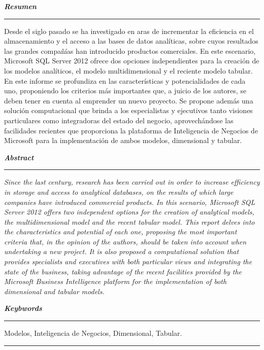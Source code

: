 \documentclass[11pt,a4paper]{article}
\begin{document}
	\textbf{\textit{\large Resumen}}\rule[1.5mm]{5mm}{0.1mm}		
	Desde el siglo pasado se ha investigado en aras de incrementar la eficiencia en el almacenamiento y el acceso a las bases de datos analíticas, sobre cuyos resultados las grandes compañías han introducido productos comerciales. En este escenario, Microsoft SQL Server 2012 ofrece dos opciones independientes para la creación de los modelos analíticos, el modelo multidimensional y el reciente modelo tabular. En este informe se profundiza en las características y potencialidades de cada uno, proponiendo los criterios más importantes que, a juicio de los autores, se deben tener en cuenta al emprender un nuevo proyecto. Se propone además una solución computacional que brinda a los especialistas y ejecutivos tanto visiones particulares como integradoras del estado del negocio, aprovechándose las facilidades recientes que proporciona la plataforma de Inteligencia de Negocios de Microsoft para la implementación de ambos modelos, dimensional y tabular.\\
	
	
	\newpage
	
	\textbf{\textit{\large Abstract}}\rule[1.5mm]{5mm}{0.1mm} 		
	\textit{
		Since the last century, research has been carried out in order to increase efficiency in storage and access to analytical databases, on the results of which large companies have introduced commercial products. In this scenario, Microsoft SQL Server 2012 offers two independent options for the creation of analytical models, the multidimensional model and the recent tabular model. This report delves into the characteristics and potential of each one, proposing the most important criteria that, in the opinion of the authors, should be taken into account when undertaking a new project. It is also proposed a computational solution that provides specialists and executives with both particular views and integrating the state of the business, taking advantage of the recent facilities provided by the Microsoft Business Intelligence platform for the implementation of both dimensional and tabular models.
	}
	
	\vspace{\baselineskip}
	
	\textbf{\textit{\large Keybwords}}\rule[1.5mm]{5mm}{0.1mm} 
	Modelos, Inteligencia de Negocios, Dimensional, Tabular.
	
	
	\rule{167mm}{0.1mm}
	
	\vspace{\baselineskip}
	
\end{document}
